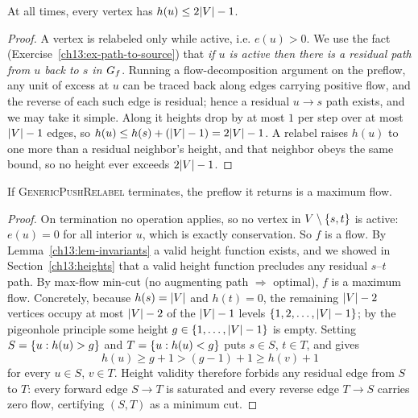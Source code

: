 \begin{lemma}
\label{ch13:lem-height-bound}
At all times, every vertex has $h(u)\le 2\lvert V\rvert-1$.
\end{lemma}

\begin{proof}
A vertex is relabeled only while active, i.e. $e(u)>0$. We use the fact (Exercise~\ref{ch13:ex-path-to-source}) that \emph{if $u$ is active then there is a residual path from $u$ back to $s$ in $G_f$}. Running a flow-decomposition argument on the preflow, any unit of excess at $u$ can be traced back along edges carrying positive flow, and the reverse of each such edge is residual; hence a residual $u\!\to\!s$ path exists, and we may take it simple. Along it heights drop by at most $1$ per step over at most $\lvert V\rvert-1$ edges, so $h(u)\le h(s)+(\lvert V\rvert-1)=2\lvert V\rvert-1$. A relabel raises $h(u)$ to one more than a residual neighbor's height, and that neighbor obeys the same bound, so no height ever exceeds $2\lvert V\rvert-1$.
\end{proof}

\begin{theorem}
\label{ch13:thm-correct}
If \textsc{GenericPushRelabel} terminates, the preflow it returns is a maximum flow.
\end{theorem}

\begin{proof}
On termination no operation applies, so no vertex in $V\setminus\{s,t\}$ is active: $e(u)=0$ for all interior $u$, which is exactly conservation. So $f$ is a flow. By Lemma~\ref{ch13:lem-invariants} a valid height function exists, and we showed in Section~\ref{ch13:heights} that a valid height function precludes any residual $s$--$t$ path. By max-flow min-cut (no augmenting path $\Rightarrow$ optimal), $f$ is a maximum flow. Concretely, because $h(s)=\lvert V\rvert$ and $h(t)=0$, the remaining $\lvert V\rvert-2$ vertices occupy at most $\lvert V\rvert-2$ of the $\lvert V\rvert-1$ levels $\{1,2,\dots,\lvert V\rvert-1\}$; by the pigeonhole principle some height $g\in\{1,\dots,\lvert V\rvert-1\}$ is empty. Setting $S=\{u:h(u)>g\}$ and $T=\{u:h(u)<g\}$ puts $s\in S$, $t\in T$, and gives
\[
  h(u)\ge g+1 > (g-1)+1 \ge h(v)+1
\]
for every $u\in S$, $v\in T$. Height validity therefore forbids any residual edge from $S$ to $T$: every forward edge $S\to T$ is saturated and every reverse edge $T\to S$ carries zero flow, certifying $(S,T)$ as a minimum cut.
\end{proof}


